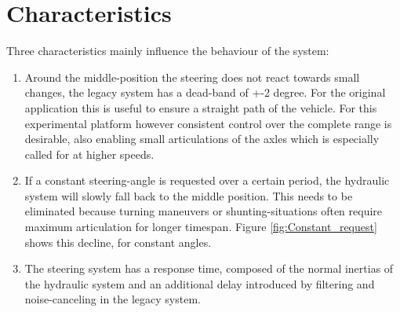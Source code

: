 \documentclass[root.tex]{subfiles}
\begin{document}
	
	{\pagestyle{empty}}
	\section{Characteristics}
	\label{chap:Delays}
	
	Three characteristics mainly influence the behaviour of the system: 
	
	\begin{enumerate}
		\item Around the middle-position the steering does not react towards small changes, the legacy system has a dead-band of +-2 degree. For the original application this is useful to ensure a straight path of the vehicle. For this experimental platform however consistent control over the complete range is desirable, also enabling small articulations of the axles which is especially called for at higher speeds. 
		\item If a constant steering-angle is requested over a certain period, the hydraulic system will slowly fall back to the middle position. This needs to be eliminated because turning maneuvers or shunting-situations often require maximum articulation for longer timespan. Figure \ref{fig:Constant_request} shows this decline, for constant angles.
		\item The steering system has a response time, composed of the normal inertias of the hydraulic system and an additional delay introduced by filtering and noise-canceling in the legacy system. 
		
	\end{enumerate}
	
\end{document}
